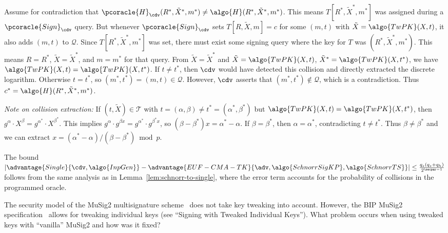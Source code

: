 \begin{mysolution}
  Assume for contradiction that $\pcoracle{H}_{\cdv}(R^*, \tilde{X}^*, m^*) \neq \algo{H}(R^*, \tilde{X}^*, m^*)$.
  This means $T[R^*, \tilde{X}^*, m^*]$ was assigned during a $\pcoracle{Sign}_{\cdv}$ query.
  But whenever $\pcoracle{Sign}_{\cdv}$ sets $T[R, \tilde{X}, m] = c$ for some $(m, t)$ with $\tilde{X} = \algo{TwPK}(X, t)$, it also adds $(m, t)$ to $\mathcal{Q}$.
  Since $T[R^*, \tilde{X}^*, m^*]$ was set, there must exist some signing query where the key for $T$ was $(R^*, \tilde{X}^*, m^*)$.
  This means $R = R^*$, $\tilde{X} = \tilde{X}^*$, and $m = m^*$ for that query.
  From $\tilde{X} = \tilde{X}^*$ and $\tilde{X} = \algo{TwPK}(X, t)$, $\tilde{X}^* = \algo{TwPK}(X, t^*)$, we have $\algo{TwPK}(X, t) = \algo{TwPK}(X, t^*)$.
  If $t \neq t^*$, then $\cdv$ would have detected this collision and directly extracted the discrete logarithm.
  Otherwise $t = t^*$, so $(m^*, t^*) = (m, t) \in \mathcal{Q}$.
  However, $\cdv$ asserts that $(m^*, t^*) \notin \mathcal{Q}$, which is a contradiction.
  Thus $c^* = \algo{H}(R^*, \tilde{X}^*, m^*)$.
  
  \emph{Note on collision extraction:} If $(t, \tilde{X}) \in \mathcal{T}$ with $t = (\alpha, \beta) \neq t^* = (\alpha^*, \beta^*)$ but $\algo{TwPK}(X, t) = \algo{TwPK}(X, t^*)$, then $g^\alpha \cdot X^\beta = g^{\alpha^*} \cdot X^{\beta^*}$.
  This implies $g^\alpha \cdot g^{\beta x} = g^{\alpha^*} \cdot g^{\beta^* x}$, so $(\beta - \beta^*)x = \alpha^* - \alpha$.
  If $\beta = \beta^*$, then $\alpha = \alpha^*$, contradicting $t \neq t^*$.
  Thus $\beta \neq \beta^*$ and we can extract $x = (\alpha^* - \alpha)/(\beta - \beta^*) \bmod p$.
  
  The bound $|\advantage{Single}{\cdv, \algo{InpGen}} - \advantage{EUF-CMA-TK}{\adv, \algo{SchnorrSigKP}, \algo{SchnorrTS}}| \leq \frac{q_s(q_s + q_h)}{2^{\secpar-1}}$ follows from the same analysis as in Lemma~\ref{lem:schnorr-to-single}, where the error term accounts for the probability of collisions in the programmed oracle.
\end{mysolution}
\fi

\begin{exercise}[Optional]
  The security model of the MuSig2 multisignature scheme~\cite{C:NicRufSeu21} does not take key tweaking into account.
  However, the BIP MuSig2 specification~\cite{add:bip-musig2} allows for tweaking individual keys (see ``Signing with Tweaked Individual Keys'').
  What problem occurs when using tweaked keys with ``vanilla'' MuSig2 and how was it fixed?
\end{exercise}

